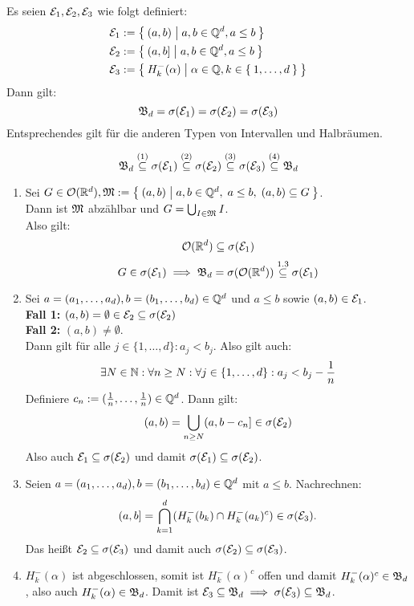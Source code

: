 \begin{satz}
\label{Satz 1.4}
Es seien $\mathcal{E}_1,\mathcal{E}_2,\mathcal{E}_3$ wie folgt definiert:
\begin{align*}
\mathcal{E}_1&:=\Set{(a,b) | a,b\in\ensuremath{\mathbb{Q}}^d,a\le b}\\
\mathcal{E}_2&:=\Set{(a,b] | a,b\in\ensuremath{\mathbb{Q}}^d, a\le b}\\
\mathcal{E}_3&:=\Set{H^-_k(\alpha) | \alpha\in\ensuremath{\mathbb{Q}}, k \in \Set{1,\dots,d}}
\end{align*}
Dann gilt:
\[\mathfrak{B}_d=\sigma(\mathcal{E}_1)=\sigma(\mathcal{E}_2)=\sigma(\mathcal{E}_3)\]
Entsprechendes gilt für die anderen Typen von Intervallen und Halbräumen.
\end{satz}

\begin{beweis}
\[\mathfrak{B}_d 
    \stackrel{(1)}{\subseteq} \sigma(\mathcal{E}_1) 
    \stackrel{(2)}{\subseteq} \sigma(\mathcal{E}_2) 
    \stackrel{(3)}{\subseteq} \sigma(\mathcal{E}_3) 
    \stackrel{(4)}{\subseteq} \mathfrak{B}_d
\]
\begin{enumerate}
    \item Sei $G\in\mathcal{O}(\mathbb{R}^d), \mathfrak{M}:=\Set{(a,b) | a,b \in \ensuremath{\mathbb{Q}}^d, \; a\le b, \; (a,b)\subseteq G}$.\\
          Dann ist $\mathfrak{M}$ abzählbar und $G=\bigcup_{I\in\mathfrak{M}}I$.\\
          Also gilt:
          \[\mathcal{O}(\mathbb{R}^d) \subseteq \sigma(\mathcal{E}_1)\]
          \[G\in\sigma(\mathcal{E}_1)\implies \mathfrak{B}_d=\sigma(\mathcal{O}(\mathbb{R}^d))\stackrel{1.3}{\subseteq}\sigma(\mathcal{E}_1)\]
    \item Sei $a=(a_1, \dots,a_d), b=(b_1,\dots,b_d) \in \mathbb{Q}^d$ und $a \leq b$ sowie $(a, b)\in\mathcal{E}_1$.\\
          \textbf{Fall 1:} $(a,b)=\emptyset\in\mathcal{E}_2\subseteq\sigma(\mathcal{E}_2)$\\
          \textbf{Fall 2:} $(a,b)\ne\emptyset$.\\
          Dann gilt für alle $j\in\{1,\dots,d\}:a_j<b_j$. Also gilt auch:
          \[\exists N\in\mathbb{N}:\forall n\ge N: \forall j\in\{1,\dots,d\}:a_j<b_j-\frac1n\]
          Definiere $c_n:=(\frac1n,\dots,\frac1n)\in\mathbb{Q}^d$. Dann gilt:
          \[(a,b)=\bigcup_{n\ge N}(a,b-c_n]\in\sigma(\mathcal{E}_2)\]
          Also auch $\mathcal{E}_1\subseteq\sigma(\mathcal{E}_2)$ und damit 
          $\sigma(\mathcal{E}_1)\subseteq\sigma(\mathcal{E}_2)$.
    \item Seien $a = (a_1,\dots,a_d), b=(b_1,\dots,b_d) \in \mathbb{Q}^d$ 
          mit $a \leq b$. 
          Nachrechnen:
          \[(a,b] = \bigcap_{k=1}^d (H^-_k(b_k) \cap H^-_k(a_k)^c) \in \sigma(\mathcal{E}_3). \]
          Das heißt $\mathcal{E}_2 \subseteq \sigma(\mathcal{E}_3)$ und damit auch 
          $\sigma(\mathcal{E}_2) \subseteq \sigma(\mathcal{E}_3)$. 
    \item $H^-_k(\alpha)$ ist abgeschlossen, somit ist 
          $H^-_k(\alpha)^c$ offen und damit $H^-_k(\alpha)^c \in \mathfrak{B}_d$, 
          also auch $H^-_k(\alpha) \in \mathfrak{B}_d$. Damit ist 
          $\mathcal{E}_3 \subseteq \mathfrak{B}_d \implies \sigma(\mathcal{E}_3) \subseteq \mathfrak{B}_d$. 
\end{enumerate}
\end{beweis}

